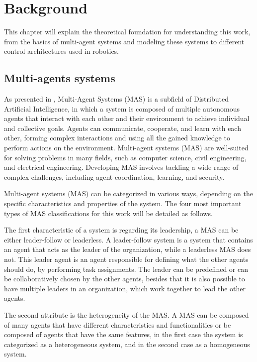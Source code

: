 \def \MOISEp {$\mathcal{M}OISE^+$}
\def \MOISEpBf {$\mathbf{\mathcal{M}OISE^+}$}

\chapter{Background}
\label{ch:background}

This chapter will explain the theoretical foundation for understanding this work, from the basics of multi-agent systems and modeling these systems to different control architectures used in robotics.

\section{Multi-agents systems}

As presented in \cite{MASSurvey}, Multi-Agent Systems (MAS) is a subfield of Distributed Artificial Intelligence, in which a system is composed of multiple autonomous agents that interact with each other and their environment to achieve individual and collective goals. Agents can communicate, cooperate, and learn with each other, forming complex interactions and using all the gained knowledge to perform actions on the environment. Multi-agent systems (MAS) are well-suited for solving problems in many fields, such as computer science, civil engineering, and electrical engineering. Developing MAS involves tackling a wide range of complex challenges, including agent coordination, learning, and security.

Multi-agent systems (MAS) can be categorized in various ways, depending on the specific characteristics and properties of the system. The four most important types of MAS classifications for this work will be detailed as follows.

The first characteristic of a system is regarding its leadership, a MAS can be either leader-follow or leaderless. A leader-follow system is a system that contains an agent that acts as the leader of the organization, while a leaderless MAS does not. This leader agent is an agent responsible for defining what the other agents should do, by performing task assignments. The leader can be predefined or can be collaboratively chosen by the other agents, besides that it is also possible to have multiple leaders in an organization, which work together to lead the other agents.

The second attribute is the heterogeneity of the MAS. A MAS can be composed of many agents that have different characteristics and functionalities or be composed of agents that have the same features, in the first case the system is categorized as a heterogeneous system, and in the second case as a homogeneous system.

